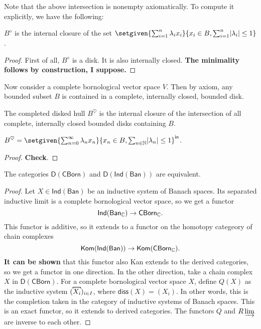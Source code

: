 Note that the above intersection is nonempty axiomatically. To compute it explicitly, we have the following:

\begin{lemma}
    \(B^\diamond \) is the internal closure of the set \(\setgiven{\sum_{i=1}^n \lambda_i x_i}{x_i \in B, \sum_{i=1}^n \abs{\lambda_i}\leq 1}\).
\end{lemma}

\begin{proof}
    First of all, \(B^\diamond\) is a disk. It is also internally closed. \textbf{The minimality follows by construction, I suppose.}
\end{proof}

Now consider a complete bornological vector space \(V\). Then by axiom, any bounded subset \(B\) is contained in a complete, internally closed, bounded disk. 

\begin{definition}
The completed disked hull \(B^{\heartsuit}\) is the internal closure of the intersection of all complete, internally closed bounded disks containing \(B\).
\end{definition}

\begin{lemma}
    \(B^\heartsuit = \setgiven{\sum_{n=0}^\infty \lambda_n x_n}{x_n \in B, \sum_{n \in \N} \abs{\lambda_n} \leq 1}^\intc\).
\end{lemma}

\begin{proof}
    \textbf{Check}.
\end{proof}


\begin{theorem}
    The categories \(\mathsf{D}(\mathsf{CBorn})\) and \(\mathsf{D}(\mathsf{Ind}(\mathsf{Ban}))\) are equivalent.
\end{theorem}

\begin{proof}
    Let \(X \in \mathsf{Ind}(\mathsf{Ban})\) be an inductive system of Banach spaces. Its separated inductive limit is a complete bornological vector space, so we get a functor \[\mathsf{Ind}(\mathsf{Ban}_\mathbb C) \to \mathsf{CBorn}_\mathbb C.\] This functor is additive, so it extends to a functor on the homotopy categeory of chain complexes \[\mathsf{Kom}(\mathsf{Ind}(\mathsf{Ban})) \to \mathsf{Kom}(\mathsf{CBorn}_\mathbb C).\] \textbf{It can be shown} that this functor also Kan extends to the derived categories, so we get a functor in one direction. In the other direction, take a chain complex \(X\) in \(\mathsf{D}(\mathsf{CBorn})\). For a complete bornological vector space \(X\), define \(Q(X)\) as the inductive system \((\comb{X_i})_{i \in I}\), where \(\mathsf{diss}(X) = (X_i)\). In other words, this is the completion taken in the category of inductive systems of Banach spaces. This is an exact functor, so it extends to derived categories. The functors \(Q\) and \(R\varinjlim\) are inverse to each other.  
\end{proof}